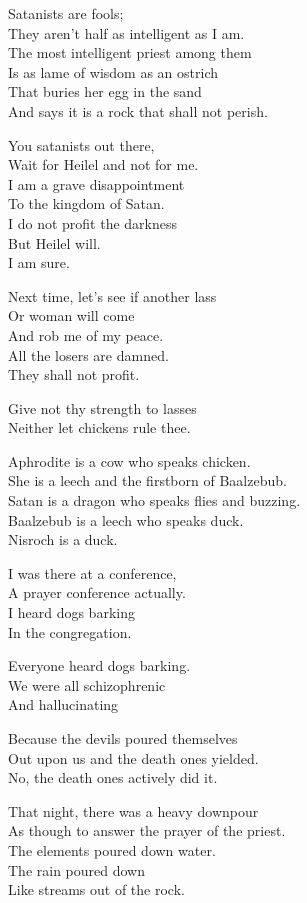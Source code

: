 \documentclass[
]{book}
\begin{document}
Satanists are fools;\\
They aren't half as intelligent as I am.\\
The most intelligent priest among them\\
Is as lame of wisdom as an ostrich\\
That buries her egg in the sand\\
And says it is a rock that shall not perish.

You satanists out there,\\
Wait for Heilel and not for me.\\
I am a grave disappointment\\
To the kingdom of Satan.\\
I do not profit the darkness\\
But Heilel will.\\
I am sure.

Next time, let's see if another lass\\
Or woman will come\\
And rob me of my peace.\\
All the losers are damned.\\
They shall not profit.

Give not thy strength to lasses\\
Neither let chickens rule thee.

Aphrodite is a cow who speaks chicken.\\
She is a leech and the firstborn of Baalzebub.\\
Satan is a dragon who speaks flies and buzzing.\\
Baalzebub is a leech who speaks duck.\\
Nisroch is a duck.

I was there at a conference,\\
A prayer conference actually.\\
I heard dogs barking\\
In the congregation.

Everyone heard dogs barking.\\
We were all schizophrenic\\
And hallucinating

Because the devils poured themselves\\
Out upon us and the death ones yielded.\\
No, the death ones actively did it.

That night, there was a heavy downpour\\
As though to answer the prayer of the priest.\\
The elements poured down water.\\
The rain poured down\\
Like streams out of the rock.
\end{document}
